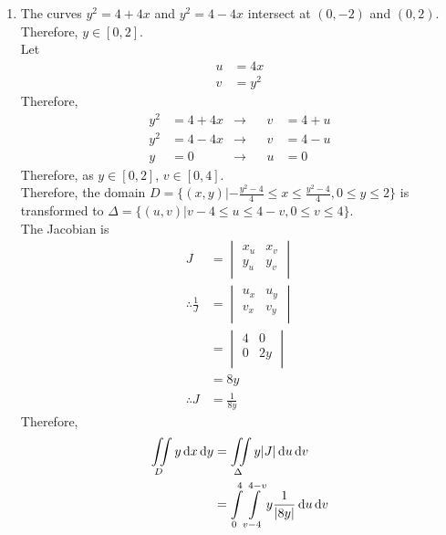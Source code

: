 \documentclass[fleqn, a4paper, 11pt, oneside]{amsart}
\theoremstyle{definition}
\theoremstyle{theorem}
\begin{document}
\begin{solution}
	\begin{enumerate}[leftmargin = *]
		\item
			The curves $y^2 = 4 + 4 x$ and $y^2 = 4 - 4 x$ intersect at $(0,-2)$ and $(0,2)$.\\
			Therefore, $y \in [0,2]$.\\
			Let
			\begin{align*}
				u & = 4 x \\
				v & = y^2
			\end{align*}
			Therefore,
			\begin{align*}
				y^2 & = 4 + 4 x & \to &  & v & = 4 + u \\
				y^2 & = 4 - 4 x & \to &  & v & = 4 - u \\
				y   & = 0       & \to &  & u & = 0
			\end{align*}
			Therefore, as $y \in [0,2]$, $v \in [0,4]$.\\
			Therefore, the domain $D = \{ (x,y) | -\frac{y^2 - 4}{4} \le x \le \frac{y^2 - 4}{4} , 0 \le y \le 2 \}$ is transformed to $\Delta = \{ (u,v) | v - 4 \le u \le 4 - v , 0 \le v \le 4 \}$.\\
			The Jacobian is
			\begin{align*}
				J &=
					\begin{vmatrix}
						x_u & x_v \\
						y_u & y_v \\
					\end{vmatrix}\\
				\therefore \frac{1}{J} &=
					\begin{vmatrix}
						u_x & u_y \\
						v_x & v_y \\
					\end{vmatrix}\\
				&=
					\begin{vmatrix}
						4 & 0   \\
						0 & 2 y \\
					\end{vmatrix}\\
				&= 8 y\\
				\therefore J &= \frac{1}{8 y}
			\end{align*}
			Therefore,
			\begin{align*}
				\iint\limits_{D} y \dif x \dif y & = \iint\limits_{\Delta} y |J| \dif u \dif v                                       \\
                                                                 & = \int\limits_{0}^{4} \int\limits_{v - 4}^{4 - v} y \frac{1}{|8 y|} \dif u \dif v \\

\end{align*}
\end{enumerate}
\end{solution}
\end{document}
